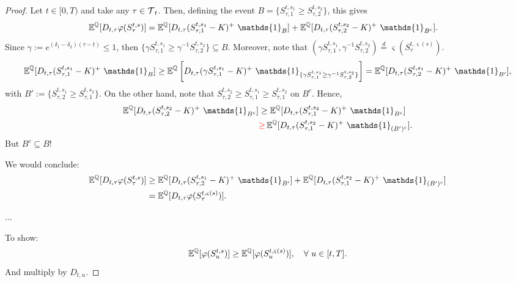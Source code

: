 \begin{proof}
Let $t\in [0,T)$ and take any $\tau \in \operatorname{\mathcal{T}}_t$. Then, defining the event $B = \{S^{t,s_1}_{\tau,1} \ge  S^{t,s_2}_{\tau,2}\}$, this gives
\begin{align*}
    \E^{\Q}[D_{t,\tau} \varphi(S^{t,s}_{\tau}) ] &= \E^{\Q}[D_{t,\tau} (S^{t,s_1}_{\tau,1}-K)^+ \ \mathds{1}_{B} ] + \E^{\Q}[D_{t,\tau} (S^{t,s_2}_{\tau,2}-K)^+ \ \mathds{1}_{B^c} ]. 
\end{align*}
Since $\gamma := e^{(\delta_1-\delta_2)(\tau-t)} \le 1$, then  $\{\gamma S^{t,s_1}_{\tau,1} \ge  \gamma^{-1} S^{t,s_2}_{\tau,2}\} \subseteq B$. Moreover, note that $(\gamma S^{t,s_1}_{\tau,1},\gamma^{-1} S^{t,s_2}_{\tau,2}) \overset{d}{=} \varsigma(S^{t,\varsigma(s)}_{\tau})$. 
\begin{equation*}
    \E^{\Q}[D_{t,\tau} (S^{t,s_1}_{\tau,1}-K)^+ \ \mathds{1}_{B} ] \ge  \E^{\Q}\left[D_{t,\tau} (\gamma S^{t,s_1}_{\tau,1}-K)^+ \ \mathds{1}_{\{\gamma S^{t,s_1}_{\tau,1} \ge  \gamma^{-1} S^{t,s_2}_{\tau,2}\}} \right ] = \E^{\Q}[D_{t,\tau} ( S^{t,s_1}_{\tau,2}-K)^+ \ \mathds{1}_{B'} ],
\end{equation*}
with $B':= \{ S^{t,s_1}_{\tau,2} \ge  S^{t,s_2}_{\tau,1}\}$. On the other hand, note that $S^{t,s_2}_{\tau,2} \ge S^{t,s_1}_{\tau,1} \ge S^{t,s_2}_{\tau,1} $ on $B^c$. Hence, 
\begin{align*}
    \E^{\Q}[D_{t,\tau} (S^{t,s_2}_{\tau,2}-K)^+ \ \mathds{1}_{B^c} ] &\ge  \E^{\Q}[D_{t,\tau} (S^{t,s_2}_{\tau,1}-K)^+ \ \mathds{1}_{B^c} ]\\
    &\rr{\ge} \E^{\Q}[D_{t,\tau} (S^{t,s_2}_{\tau,1}-K)^+ \ \mathds{1}_{(B')^c} ].
\end{align*}
But $B^c \subseteq B$!

We would conclude: 
\begin{align*}
    \E^{\Q}[D_{t,\tau} \varphi(S^{t,s}_{\tau}) ] &\ge \E^{\Q}[D_{t,\tau} ( S^{t,s_1}_{\tau,2}-K)^+ \ \mathds{1}_{B'} ] + \E^{\Q}[D_{t,\tau} (S^{t,s_2}_{\tau,1}-K)^+ \ \mathds{1}_{(B')^c} ]\\ 
    &= \E^{\Q}[D_{t,\tau} \varphi(S^{t,\varsigma(s)}_{\tau}) ]. 
\end{align*}

...

To show: 
$$\operatorname{\mathbb{E}}^{\operatorname{\mathbb{Q}}}[ \varphi(S^{t,s}_{u}) ] \ge \operatorname{\mathbb{E}}^{\operatorname{\mathbb{Q}}}[ \varphi(S^{t,\varsigma(s)}_{u}) ], \quad \forall \ u \in [t,T].  $$
And multiply by $D_{t,u}$. 


\end{proof}
